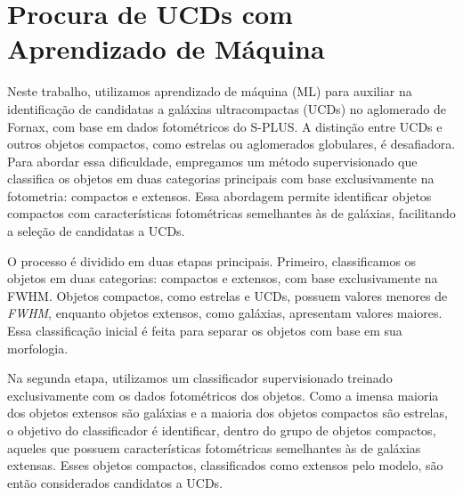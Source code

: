 
\section{Procura de UCDs com Aprendizado de Máquina}\label{sec:aprendizado_maquina}
Neste trabalho, utilizamos aprendizado de máquina (\ac{ML}) para auxiliar na identificação de candidatas a galáxias ultracompactas (UCDs) no aglomerado de Fornax, com base em dados fotométricos do S-PLUS. A distinção entre UCDs e outros objetos compactos, como estrelas ou aglomerados globulares, é desafiadora. Para abordar essa dificuldade, empregamos um método supervisionado que classifica os objetos em duas categorias principais com base exclusivamente na fotometria: compactos e extensos. Essa abordagem permite identificar objetos compactos com características fotométricas semelhantes às de galáxias, facilitando a seleção de candidatas a UCDs.

O processo é dividido em duas etapas principais. Primeiro, classificamos os objetos em duas categorias: compactos e extensos, com base exclusivamente na \ac{FWHM}. Objetos compactos, como estrelas e UCDs, possuem valores menores de \textit{FWHM}, enquanto objetos extensos, como galáxias, apresentam valores maiores. Essa classificação inicial é feita para separar os objetos com base em sua morfologia.

Na segunda etapa, utilizamos um classificador supervisionado treinado exclusivamente com os dados fotométricos dos objetos. Como a imensa maioria dos objetos extensos são galáxias e a maioria dos objetos compactos são estrelas, o objetivo do classificador é identificar, dentro do grupo de objetos compactos, aqueles que possuem características fotométricas semelhantes às de galáxias extensas. Esses objetos compactos, classificados como extensos pelo modelo, são então considerados candidatos a UCDs.

